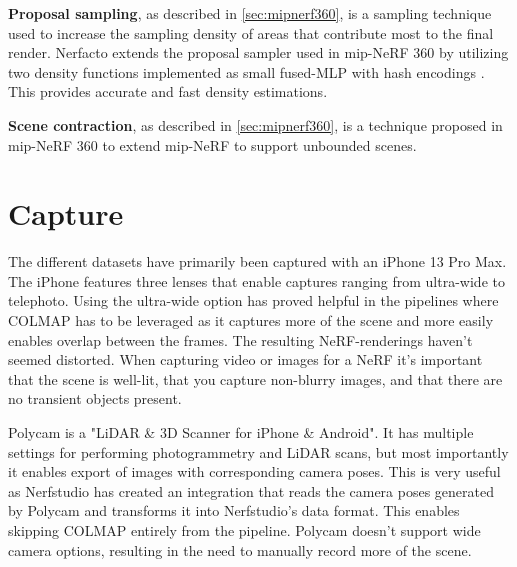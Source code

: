 \textbf{Proposal sampling}, as described in \autoref{sec:mipnerf360}, is a sampling technique used to increase the sampling density of areas that contribute most to the final render. Nerfacto extends the proposal sampler used in mip-NeRF 360 \cite{barronMipNeRF360Unbounded2022} by utilizing two density functions implemented as small fused-MLP with hash encodings \cite{muller_instant_2022}. This provides accurate and fast density estimations.

\textbf{Scene contraction}, as described in \autoref{sec:mipnerf360}, is a technique proposed in mip-NeRF 360 \cite{barronMipNeRF360Unbounded2022} to extend mip-NeRF to support unbounded scenes.

\section{Capture}
The different datasets have primarily been captured with an iPhone 13 Pro Max. The iPhone features three lenses that enable captures ranging from ultra-wide to telephoto. Using the ultra-wide option has proved helpful in the pipelines where COLMAP has to be leveraged as it captures more of the scene and more easily enables overlap between the frames. The resulting NeRF-renderings haven't seemed distorted. When capturing video or images for a NeRF it's important that the scene is well-lit, that you capture non-blurry images, and that there are no transient objects present.

Polycam is a "LiDAR \& 3D Scanner for iPhone \& Android". It has multiple settings for performing photogrammetry and LiDAR scans, but most importantly it enables export of images with corresponding camera poses. This is very useful as Nerfstudio has created an integration that reads the camera poses generated by Polycam and transforms it into Nerfstudio's data format. This enables skipping COLMAP entirely from the pipeline. Polycam doesn't support wide camera options, resulting in the need to manually record more of the scene.

